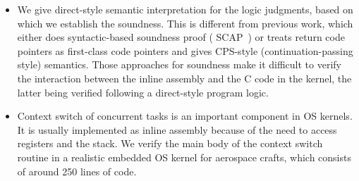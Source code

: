 \begin{itemize}
	\item
    We give direct-style semantic interpretation for
    the logic judgments, based on which we establish the
    soundness. This is different from previous
    work, which either does syntactic-based soundness proof
    (\eg{} SCAP~\cite{Feng06pldi}) or treats return code pointers
    as first-class code pointers and gives CPS-style
    (continuation-passing style) semantics.
    Those approaches for soundness make it difficult to verify
    the interaction between the inline assembly and the C
    code in the kernel, the latter being verified following
    a direct-style program logic.
	
	
	\item
	Context switch of concurrent tasks is an important
    component in OS kernels. It is usually implemented
    as inline assembly because of the need to access
    registers and the stack.
	We verify the main body of the context switch routine
	in a realistic embedded OS kernel for aerospace crafts,
    which consists of around 250 lines of \sparc{} code.


\end{itemize}
